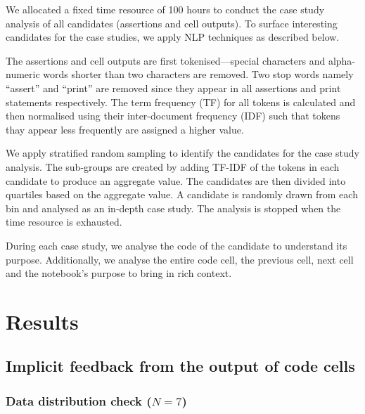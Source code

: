 We allocated a fixed time resource of 100 hours to conduct the case study analysis of all candidates (assertions and cell outputs). To surface interesting candidates for the case studies, we apply NLP techniques as described below.


The assertions and cell outputs are first tokenised---special characters and alpha-numeric words shorter than two characters are removed. Two stop words namely ``assert'' and ``print'' are removed since they appear in all assertions and print statements respectively. The term frequency (TF) for all tokens is calculated and then normalised using their inter-document frequency (IDF) such that tokens thay appear less frequently are assigned a higher value.

We apply stratified random sampling to identify the candidates for the case study analysis. The sub-groups are created by adding TF-IDF of the tokens in each candidate to produce an aggregate value. The candidates are then divided into quartiles based on the aggregate value. A candidate is randomly drawn from each bin and analysed as an in-depth case study. The analysis is stopped when the time resource is exhausted.

During each case study, we analyse the code of the candidate to understand its purpose. Additionally, we analyse the entire code cell, the previous cell, next cell and the notebook's purpose to bring in rich context.

\section{Results}

\subsection{Implicit feedback from the output of code cells}

\subsubsection{Data distribution check ($N = 7$)}

